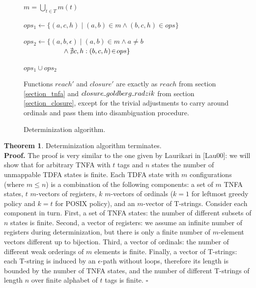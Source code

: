 \documentclass{article}
\newcommand{\Xset}{\!\leftarrow\!}
\newcommand{\Xund}{\rule{.4em}{.4pt}} %
\newcommand{\Xin}{\!\in\!}
\newcommand{\Xeq}{\!=\!}
\theoremstyle{definition}
\newtheorem{XThe}{Theorem}
\begin{document}
\begin{multicols}{2}
\begin{figure}
\begin{multicols}{2}
\begin{algorithm}[H]
{{            \Let $m \Xeq \bigcup_{t \in T} m(t)$ \;

            $ops_1 \Xset \{ (a, c, h) \mid (a, b) \Xin m \wedge (b, c, h) \Xin ops \}$ \;

            $ops_2 \Xset \{ (a, b, \epsilon) \mid (a, b) \Xin m \wedge a \!\neq\! b$
                $\hphantom{hspace{1.5em}} \wedge \nexists c, h: (b, c, h) \Xin ops \}$ \;

            \Return $ops_1 \cup ops_2$ \;
        } \lElse {
            \Return \Und
        }
    }
    \end{algorithm}

\end{multicols}
\begin{center}
\caption{Determinization algorithm.}
\small{
Functions $reach'$ and $closure'$ are exactly as
$reach$ from section \ref{section_tnfa} and $closure \Xund goldberg \Xund radzik$ from section \ref{section_closure},
except for the trivial adjustments to carry around ordinals and pass them into disambiguation procedure.
}
\end{center}
\end{figure}

\begin{XThe}
Determinization algorithm terminates.
\\[0.5em]
\textbf{Proof.}
The proof is very similar to the one given by Laurikari in [Lau00]:
we will show that for arbitrary TNFA with $t$ tags and $n$ states the number of unmappable TDFA states is finite.
Each TDFA state with $m$ configurations (where $m \!\leq\! n$) is a combination of the following components:
a set of $m$ TNFA states,
$t$ $m$-vectors of registers,
$k$ $m$-vectors of ordinals ($k \Xeq 1$ for leftmost greedy policy and $k \Xeq t$ for POSIX policy),
and an $m$-vector of T-strings.
Consider each component in turn.
First, a set of TNFA states: the number of different subsets of $n$ states is finite.
Second, a vector of registers: we assume an infinite number of registers during determinization,
but there is only a finite number of $m$-element vectors different up to bijection.
Third, a vector of ordinals: the number of different weak orderings of $m$ elements is finite.
Finally, a vector of T-strings: each T-string is induced by an $\epsilon$-path without loops,
therefore its length is bounded by the number of TNFA states,
and the number of different T-strings of length $n$ over finite alphabet of $t$ tags is finite.
$\square$
\end{XThe}



\end{multicols}
\end{document}
